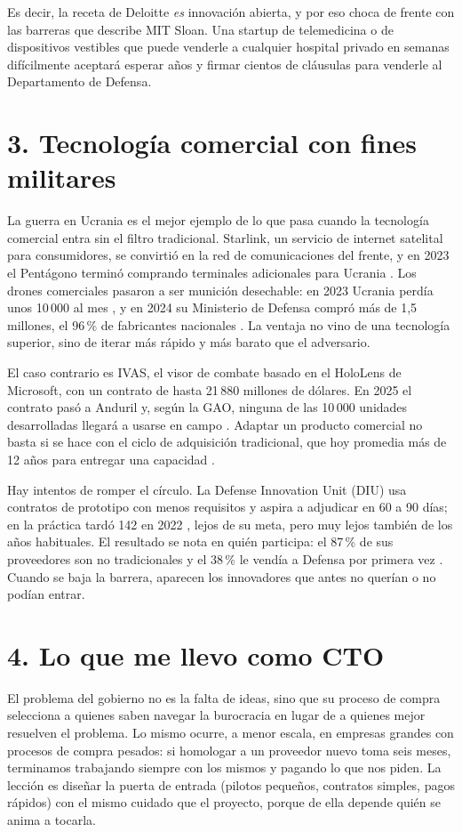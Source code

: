 \documentclass[11pt,letterpaper]{article}
\begin{document}
Es decir, la receta de Deloitte \emph{es} innovación abierta, y por eso
choca de frente con las barreras que describe MIT Sloan. Una startup de
telemedicina o de dispositivos vestibles que puede venderle a cualquier
hospital privado en semanas difícilmente aceptará esperar años y firmar
cientos de cláusulas para venderle al Departamento de Defensa.

\section*{3. Tecnología comercial con fines militares}

La guerra en Ucrania es el mejor ejemplo de lo que pasa cuando la tecnología
comercial entra sin el filtro tradicional. Starlink, un servicio de internet
satelital para consumidores, se convirtió en la red de comunicaciones del
frente, y en 2023 el Pentágono terminó comprando terminales adicionales para
Ucrania \parencite{techcrunch2023}. Los drones comerciales pasaron a ser
munición desechable: en 2023 Ucrania perdía unos 10\,000 al mes
\parencite{watling2023}, y en 2024 su Ministerio de Defensa compró más de
1,5 millones, el 96\,\% de fabricantes nacionales \parencite{euromaidan2025}.
La ventaja no vino de una tecnología superior, sino de iterar más rápido y
más barato que el adversario.

El caso contrario es IVAS, el visor de combate basado en el HoloLens de
Microsoft, con un contrato de hasta 21\,880 millones de dólares. En 2025 el
contrato pasó a Anduril y, según la GAO, ninguna de las 10\,000 unidades
desarrolladas llegará a usarse en campo \parencite{crs2026}. Adaptar un
producto comercial no basta si se hace con el ciclo de adquisición
tradicional, que hoy promedia más de 12 años para entregar una capacidad
\parencite{gao2026}.

Hay intentos de romper el círculo. La Defense Innovation Unit (DIU) usa
contratos de prototipo con menos requisitos y aspira a adjudicar en 60 a 90
días; en la práctica tardó 142 en 2022 \parencite{diu2022}, lejos de su
meta, pero muy lejos también de los años habituales. El resultado se nota en
quién participa: el 87\,\% de sus proveedores son no tradicionales y el
38\,\% le vendía a Defensa por primera vez \parencite{diu2024}. Cuando se
baja la barrera, aparecen los innovadores que antes no querían o no podían
entrar.

\section*{4. Lo que me llevo como CTO}

El problema del gobierno no es la falta de ideas, sino que su proceso de
compra selecciona a quienes saben navegar la burocracia en lugar de a
quienes mejor resuelven el problema. Lo mismo ocurre, a menor escala, en
empresas grandes con procesos de compra pesados: si homologar a un proveedor
nuevo toma seis meses, terminamos trabajando siempre con los mismos y
pagando lo que nos piden. La lección es diseñar la puerta de entrada (pilotos
pequeños, contratos simples, pagos rápidos) con el mismo cuidado que el
proyecto, porque de ella depende quién se anima a tocarla.

\printbibliography[title={Referencias}]
\end{document}
